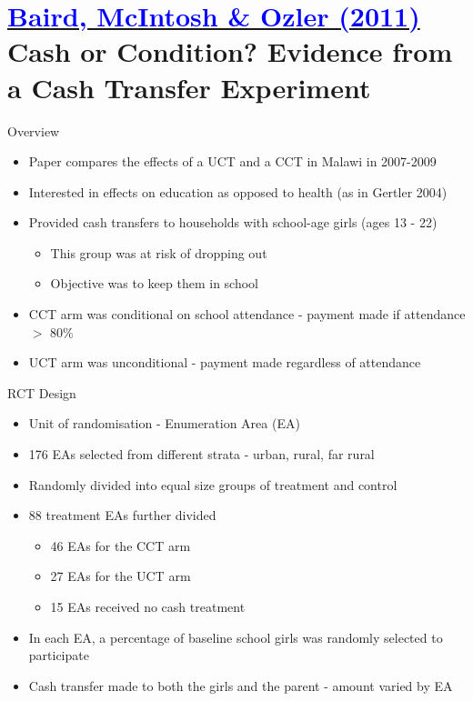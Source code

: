 \documentclass[11pt,notes=hide,aspectratio=169,mathserif]{beamer}
\begin{document}
\section*{\href{https://academic.oup.com/qje/article-abstract/126/4/1709/1922509?login=false}{\textcolor{blue}{Baird, McIntosh \& Ozler (2011)}} \\[5mm] 
\textnormal{\small{Cash or Condition? Evidence from a Cash Transfer Experiment}}}

\begin{frame}{Overview}
\begin{itemize}
\item Paper compares the effects of a UCT and a CCT in Malawi in 2007-2009
\pause \item Interested in effects on education as opposed to health (as in Gertler 2004)
\pause \item Provided cash transfers to households with school-age girls (ages 13 - 22)
\begin{itemize}
    \pause \item This group was at risk of dropping out 
    \pause \item Objective was to keep them in school
\end{itemize}
\pause \item CCT arm was conditional on school attendance - payment made if attendance $>$ 80\%
\pause \item UCT arm was unconditional - payment made regardless of attendance
\end{itemize}
\end{frame}

\begin{frame}{RCT Design}
\begin{itemize}
\item Unit of randomisation - Enumeration Area (EA)
\pause \item 176 EAs selected from different strata - urban, rural, far rural 
\pause \item Randomly divided into equal size groups of treatment and control 
\pause \item 88 treatment EAs further divided 
\begin{itemize}
    \pause \item 46 EAs for the CCT arm
    \pause \item 27 EAs for the UCT arm 
    \pause \item 15 EAs received no cash treatment
\end{itemize}
\pause \item In each EA, a percentage of baseline school girls was randomly selected to participate 
\pause \item Cash transfer made to both the girls and the parent - amount varied by EA 
\end{itemize}
\end{frame}
\end{document}
